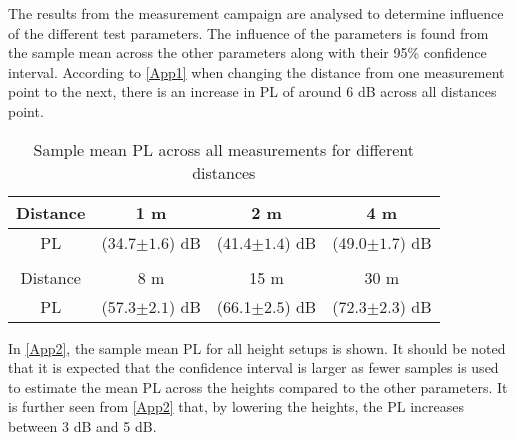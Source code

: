 
The results from the measurement campaign are analysed to determine influence of the different test parameters. The influence of the parameters is found from the sample mean across the other parameters along with their 95\% confidence interval. According to \autoref{App1} when changing the distance from one measurement point to the next, there is an increase in PL of around 6 dB across all distances point.
\vspace{2em}
\begin{table}[!htbp]
\centering
\caption{Sample mean PL across all measurements for different distances}
\label{App1}
\begin{tabular}{|c|c|c|c|}
\hline
Distance    & 1 m & 2 m& 4 m\\\hline
PL & (34.7$\pm 1.6$) dB & (41.4$\pm 1.4$) dB & (49.0$\pm 1.7$) dB  \\\hline
\multicolumn{4}{c}{}\\\hline
Distance	&8 m& 15 m& 30 m\\\hline
PL &	(57.3$\pm 2.1$) dB & (66.1$\pm 2.5$) dB & (72.3$\pm 2.3$) dB \\\hline
\end{tabular}
\end{table}


\newpage
In \autoref{App2}, the sample mean PL for all height setups is shown. It should be noted that it is expected that the confidence interval is larger as fewer samples is used to estimate the mean PL across the heights compared to the other parameters. It is further seen from \autoref{App2} that, by lowering the heights, the PL increases between 3 dB and 5 dB.

\begin{table}[H]
\centering
\caption{Sample mean PL across all measurements for different height combinations}
\label{App2}
\end{table}


